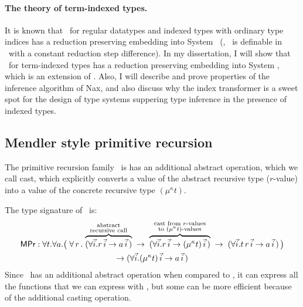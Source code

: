 \paragraph{The theory of term-indexed types.}
It is known that \MIt\ for regular datatypes and indexed types with ordinary
type indices has a reduction preserving embedding into System \Fw\ (\ie, \MIt\
is definable in \Fw\ with a constant reduction step difference).
In my dissertation, I will show that \MIt\ for term-indexed types has a
reduction preserving embedding into System \Fi, which is an extension of \Fw.
Also, I will describe and prove properties of the inference algorithm of Nax,
and also discuss why the index transformer is a sweet spot for the design of
type systems suppering type inference in the presence of indexed types.

\subsection{Mendler style primitive recursion}\label{sec:mendler:pr}
The primitive recursion family \MPr\ is has an additional abstract operation,
which we call cast, which explicitly converts a value of the abstract recursive type ($r$-value)
into a value of the concrete recursive type $(\mu^\kappa t)$.

The type signature of \MPr\ is:
\begin{multline*}
 \textsf{MPr} : \forall t . \forall a .
   \big(\; \forall\, r\, . \;
         \overset{\begin{smallmatrix}
                        \text{abstract} \\
                        \text{recursive call}
                       \end{smallmatrix}}{\overbrace{
            (\forall\vec{i} . r\,\vec{i} -> a\,\vec{i}\,) }} \;
   -> \; \overset{\begin{smallmatrix}
                        \text{cast from $r$-values} \\
                        \text{to $(\mu^\kappa t)$-values} \\
                       \end{smallmatrix}}{\overbrace{
            (\forall\vec{i} . r\,\vec{i} -> (\mu^\kappa t)\,\vec{i}\,) }} \;
   -> \;    (\forall\vec{i} . t\, r\,\vec{i} -> a\,\vec{i}\,) \,
   \big) \\
 -> (\forall\vec{i} . (\mu^\kappa t)\,\vec{i} -> a\,\vec{i}\,)
\end{multline*}
Since \MPr\ has an additional abstract operation when compared
to \MIt, it can express all the functions
that we can express with \MIt, but some can be more efficient because of the
additional casting operation.

